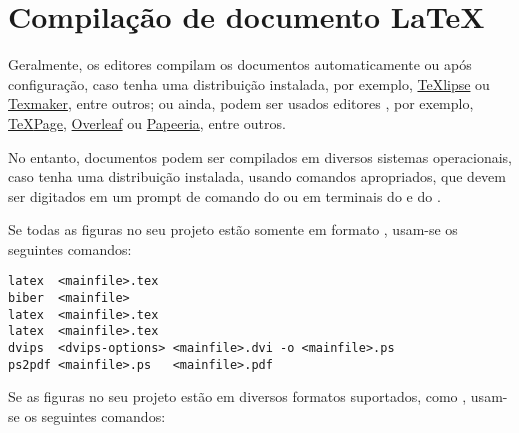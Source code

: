 \section{Compilação de documento \LaTeX}%
\label{sect:doc-comp}

Geralmente, os editores compilam os documentos automaticamente ou após configuração, caso tenha uma distribuição  instalada, por exemplo, \href{https://texlipse.sourceforge.net/}{TeXlipse\LinkIcon} ou \href{https://www.xm1math.net/texmaker/}{Texmaker\LinkIcon}, entre outros; ou ainda, podem ser usados editores , por exemplo, \href{https://www.texpage.com/}{{\TeX}Page\LinkIcon}, \href{https://www.overleaf.com/}{Overleaf\LinkIcon} ou \href{https://www.papeeria.com/}{Papeeria\LinkIcon}, entre outros.

No entanto, documentos podem ser compilados em diversos sistemas operacionais, caso tenha uma distribuição  instalada, usando comandos apropriados, que devem ser digitados em um prompt de comando do \textsuperscript{\textregistered} ou em terminais do  e do \textsuperscript{\textregistered}.

Se todas as figuras no seu projeto estão somente em formato , usam-se os seguintes comandos:

\begin{snugshade}
\begin{Verbatim}
latex  <mainfile>.tex
biber  <mainfile>
latex  <mainfile>.tex
latex  <mainfile>.tex
dvips  <dvips-options> <mainfile>.dvi -o <mainfile>.ps
ps2pdf <mainfile>.ps   <mainfile>.pdf
\end{Verbatim}
\end{snugshade}

Se as figuras no seu projeto estão em diversos formatos suportados, como , usam-se os seguintes comandos:

